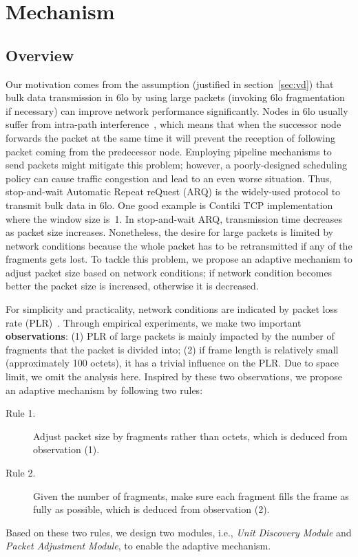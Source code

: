 \documentclass[runningheads,a4paper]{llncs}
\begin{document}
\section{Mechanism}

\subsection{Overview}\label{sec:ov}
Our motivation comes from the assumption (justified in section~\ref{sec:vd}) that bulk data transmission in 6lo by using large packets (invoking 6lo fragmentation if necessary) can improve network performance significantly. Nodes in 6lo usually suffer from intra-path interference~\cite{Kim2007}, which means that when the successor node forwards the packet at the same time it will prevent the reception of following packet coming from the predecessor node. Employing pipeline mechanisms to send packets might mitigate this problem; however, a poorly-designed scheduling policy can cause traffic congestion and lead to an even worse situation. Thus, stop-and-wait Automatic Repeat reQuest (ARQ) is the widely-used protocol to transmit bulk data in 6lo. One good example is Contiki TCP implementation where the window size is~1. In stop-and-wait ARQ, transmission time decreases as packet size increases. Nonetheless, the desire for large packets is limited by network conditions because the whole packet has to be retransmitted if any of the fragments gets lost. To tackle this problem, we propose an adaptive mechanism to adjust packet size based on network conditions; if network condition becomes better the packet size is increased, otherwise it is decreased.

For simplicity and practicality, network conditions are indicated by packet loss rate (PLR)~\cite{Bacc2012}. Through empirical experiments, we make two important \textbf{observations}: (1) PLR of large packets is mainly impacted by the number of fragments that the packet is divided into; (2) if frame length is relatively small (approximately 100 octets), it has a trivial influence on the PLR. Due to space limit, we omit the analysis here. Inspired by these two observations, we propose an adaptive mechanism by following two rules:
\begin{description}
	\item[Rule 1.] Adjust packet size by fragments rather than octets, which is deduced from observation (1).
	\item[Rule 2.] Given the number of fragments, make sure each fragment fills the frame as fully as possible, which is deduced from observation (2).
\end{description}
Based on these two rules, we design two modules, i.e., \emph{Unit Discovery Module} and \emph{Packet Adjustment Module}, to enable the adaptive mechanism.
\end{document}
